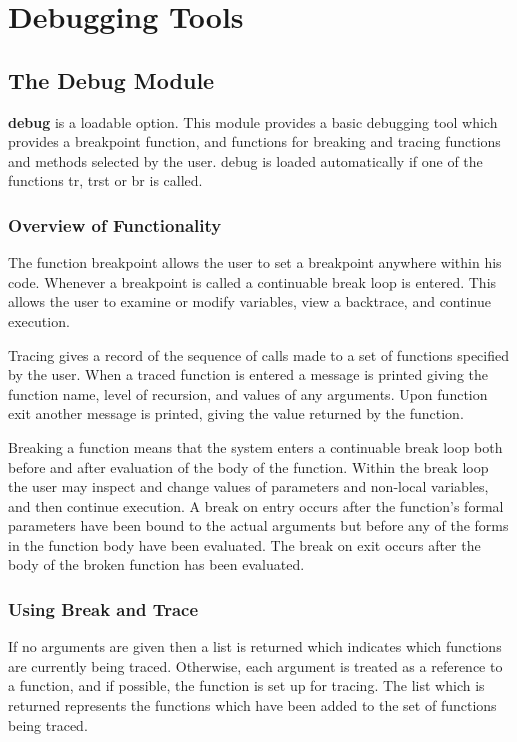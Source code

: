 \chapter{Debugging Tools}

\section{The Debug Module}

 {\bf debug} is a loadable  option.   This module provides a
basic debugging tool which provides a breakpoint  function,  and
functions   for  breaking  and  tracing  functions  and  methods
selected by the user.  debug is loaded automatically if one of the
functions tr, trst or br is called.

\subsection{Overview of Functionality}

  The function breakpoint allows the user to  set  a  breakpoint
anywhere  within  his  code.   Whenever a breakpoint is called a
continuable break loop is entered.   This  allows  the  user  to
examine  or  modify  variables,  view  a backtrace, and continue
execution.

  Tracing gives a record of the sequence of calls made to a  set
of  functions  specified by the user.  When a traced function is
entered a message is printed giving the function name, level  of
recursion,  and  values  of  any  arguments.  Upon function exit
another message is printed, giving the  value  returned  by  the
function.

  Breaking a function means that the system enters a continuable
break  loop  both before and after evaluation of the body of the
function.  Within the break loop the user may inspect and change
values of parameters and non-local variables, and then  continue
execution.   A break on entry occurs after the function's formal
parameters have been bound to the actual  arguments  but  before
any  of the forms in the function body have been evaluated.  The
break on exit occurs after the body of the broken  function  has
been evaluated.

\subsection{Using Break and Trace}


{    If  no  arguments  are  given  then a list is returned which
    indicates  which  functions  are  currently  being   traced.
    Otherwise,  each  argument  is  treated  as a reference to a
    function, and if  possible,  the  function  is  set  up  for
    tracing.    The   list  which  is  returned  represents  the
    functions which have been added  to  the  set  of  functions
    being  traced.   
}

